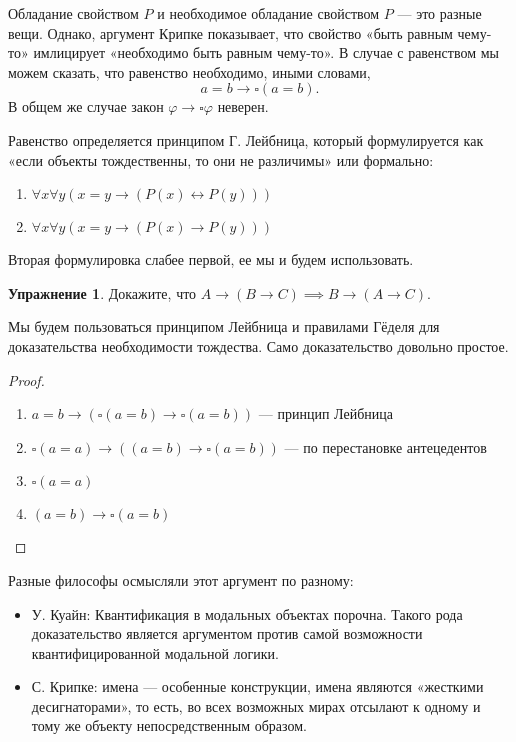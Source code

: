 \documentclass[openany]{book}
\theoremstyle{plain}
\theoremstyle{definition}
\newtheorem{xrc}{Упражнение}[]
\begin{document}
Обладание свойством \(P\) и необходимое обладание свойством \(P\) — это разные вещи. Однако, аргумент Крипке показывает, что свойство «быть равным чему-то» имлицирует «необходимо быть равным чему-то». В случае с равенством мы можем сказать, что равенство необходимо, иными словами, $$a = b \to \square(a = b).$$ В общем же случае закон \(\varphi \to \square \varphi\) неверен.

Равенство определяется принципом Г. Лейбница, который формулируется как «если объекты тождественны, то они не различимы» или формально:
\begin{enumerate}
    \item \(\forall x \forall y (x = y \to (P(x) \leftrightarrow P(y)))\)
    \item \(\forall x \forall y (x = y \to (P(x) \to P(y)))\)
\end{enumerate}

Вторая формулировка слабее первой, ее мы и будем использовать.

\begin{xrc} 
Докажите, что \(A \to (B \to C) \implies B \to (A \to C)\). 
\end{xrc}

Мы будем пользоваться принципом Лейбница и правилами Гёделя для доказательства необходимости тождества. Само доказательство довольно простое.

\begin{proof}
\begin{enumerate}
\item \(a = b \to (\square(a = b) \to \square(a = b))\) --- принцип Лейбница
\item \(\square(a = a) \to ((a = b) \to \square(a = b))\) --- по перестановке антецедентов
\item \(\square(a = a)\)
\item \((a = b) \to \square(a = b)\)
\end{enumerate}
\end{proof}

Разные философы осмысляли этот аргумент по разному:
\begin{itemize}
\item У. Куайн: Квантификация в модальных объектах порочна. Такого рода доказательство является аргументом против самой возможности квантифицированной модальной логики. 
\item С. Крипке: имена — особенные конструкции, имена являются «жесткими десигнаторами», то есть, во всех возможных мирах отсылают к одному и тому же объекту непосредственным образом.
\end{itemize}
\end{document}
